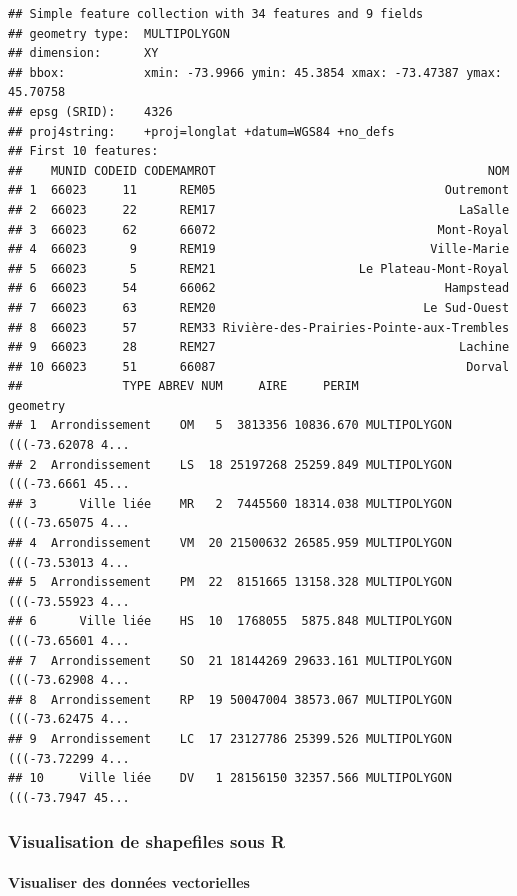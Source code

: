 \documentclass[]{article}
\let\oldparagraph\paragraph
\renewcommand{\paragraph}[1]{\oldparagraph{#1}\mbox{}}
\begin{document}
\begin{verbatim}
## Simple feature collection with 34 features and 9 fields
## geometry type:  MULTIPOLYGON
## dimension:      XY
## bbox:           xmin: -73.9966 ymin: 45.3854 xmax: -73.47387 ymax: 45.70758
## epsg (SRID):    4326
## proj4string:    +proj=longlat +datum=WGS84 +no_defs
## First 10 features:
##    MUNID CODEID CODEMAMROT                                      NOM
## 1  66023     11      REM05                                Outremont
## 2  66023     22      REM17                                  LaSalle
## 3  66023     62      66072                               Mont-Royal
## 4  66023      9      REM19                              Ville-Marie
## 5  66023      5      REM21                    Le Plateau-Mont-Royal
## 6  66023     54      66062                                Hampstead
## 7  66023     63      REM20                             Le Sud-Ouest
## 8  66023     57      REM33 Rivière-des-Prairies-Pointe-aux-Trembles
## 9  66023     28      REM27                                  Lachine
## 10 66023     51      66087                                   Dorval
##              TYPE ABREV NUM     AIRE     PERIM                       geometry
## 1  Arrondissement    OM   5  3813356 10836.670 MULTIPOLYGON (((-73.62078 4...
## 2  Arrondissement    LS  18 25197268 25259.849 MULTIPOLYGON (((-73.6661 45...
## 3      Ville liée    MR   2  7445560 18314.038 MULTIPOLYGON (((-73.65075 4...
## 4  Arrondissement    VM  20 21500632 26585.959 MULTIPOLYGON (((-73.53013 4...
## 5  Arrondissement    PM  22  8151665 13158.328 MULTIPOLYGON (((-73.55923 4...
## 6      Ville liée    HS  10  1768055  5875.848 MULTIPOLYGON (((-73.65601 4...
## 7  Arrondissement    SO  21 18144269 29633.161 MULTIPOLYGON (((-73.62908 4...
## 8  Arrondissement    RP  19 50047004 38573.067 MULTIPOLYGON (((-73.62475 4...
## 9  Arrondissement    LC  17 23127786 25399.526 MULTIPOLYGON (((-73.72299 4...
## 10     Ville liée    DV   1 28156150 32357.566 MULTIPOLYGON (((-73.7947 45...
\end{verbatim}

\subsubsection{Visualisation de shapefiles sous
R}\label{visualisation-de-shapefiles-sous-r}

\paragraph{Visualiser des données
vectorielles}\label{visualiser-des-donnuxe9es-vectorielles}
\end{document}
